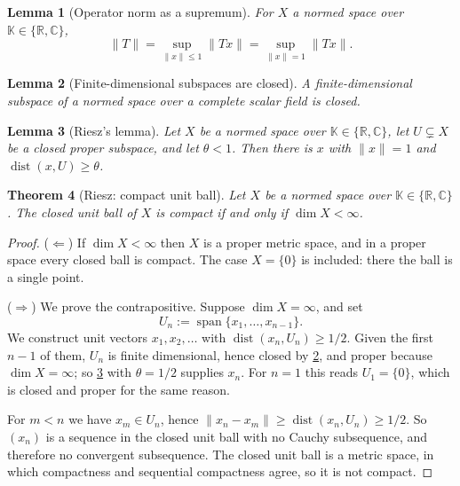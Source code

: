 \documentclass[a4paper]{report}
\theoremstyle{plain}
\newtheorem{theorem}{Theorem}[chapter]
\newtheorem{lemma}[theorem]{Lemma}
\theoremstyle{definition}
\theoremstyle{remark}
\begin{document}
\begin{lemma}[Operator norm as a supremum]
  \label{lem_opnorm_sup}
  For $X$ a normed space over $\mathbb{K} \in \{\mathbb{R},\mathbb{C}\}$,
  \[
    \|T\| = \sup_{\|x\| \le 1}\|Tx\| = \sup_{\|x\| = 1}\|Tx\| .
  \]
\end{lemma}



\begin{lemma}[Finite-dimensional subspaces are closed]
  \label{lem_findim_closed}
  A finite-dimensional subspace of a normed space over a \emph{complete} scalar field is
  closed.
\end{lemma}


\begin{lemma}[Riesz's lemma]
  \label{lem_riesz_lemma}
  Let $X$ be a normed space over $\mathbb{K} \in \{\mathbb{R},\mathbb{C}\}$, let
  $U \subsetneq X$ be a closed proper subspace, and let $\theta < 1$.  Then there is $x$
  with $\|x\| = 1$ and $\operatorname{dist}(x,U) \ge \theta$.
\end{lemma}


\begin{theorem}[Riesz: compact unit ball]
  \label{thm_riesz_ball}
  Let $X$ be a normed space over $\mathbb{K} \in \{\mathbb{R},\mathbb{C}\}$.  The closed
  unit ball of $X$ is compact if and only if $\dim X < \infty$.
\end{theorem}
\begin{proof}
  ($\Leftarrow$)  If $\dim X < \infty$ then $X$ is a proper metric space, and in a proper space every closed ball is compact.  The case $X = \{0\}$ is included: there
  the ball is a single point.

  ($\Rightarrow$)  We prove the contrapositive.  Suppose $\dim X = \infty$, and set
  \[
    U_n := \operatorname{span}\{x_1,\dots,x_{n-1}\} .
  \]
  We construct unit vectors $x_1, x_2, \dots$ with
  $\operatorname{dist}(x_n, U_n) \ge 1/2$.  Given the first $n-1$ of them, $U_n$ is
  finite dimensional, hence closed by \cref{lem_findim_closed}, and
  proper because $\dim X = \infty$; so \cref{lem_riesz_lemma} with $\theta = 1/2$ supplies
  $x_n$.  For $n = 1$ this reads $U_1 = \{0\}$, which is closed and proper for the same
  reason.

  For $m < n$ we have $x_m \in U_n$, hence
  $\|x_n - x_m\| \ge \operatorname{dist}(x_n,U_n) \ge 1/2$.  So $(x_n)$ is a sequence in
  the closed unit ball with no Cauchy subsequence, and therefore no convergent
  subsequence.  The closed unit ball is a metric space, in which compactness and sequential
  compactness agree, so it is not compact.
\end{proof}
\end{document}
